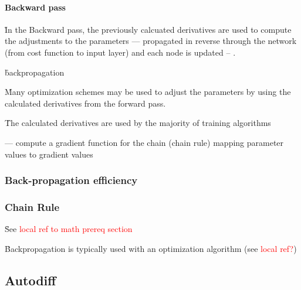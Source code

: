 \paragraph{Backward pass}

\r{In the Backward pass, the previously calcuated derivatives are used to compute the adjustments to the parameters --- propagated in reverse through the network (from cost function to input layer) and each node is updated -- .}

\r{backpropagation\cite{alber2018backprop}}

\r{Many optimization schemes  may be used to adjust the parameters by using the calculated derivatives from the forward pass.}

\r{The calculated derivatives are used by the majority of training algorithms}







\r{ --- compute a gradient function for the chain (chain rule) mapping parameter values to gradient values}

\subsubsection{Back-propagation efficiency}


\subsubsection{Chain Rule}

\r{See \textcolor{red}{local ref to math prereq section}}


\r{Backpropagation is typically used with an optimization algorithm (see \textcolor{red}{local ref?})}

\subsection{Autodiff}

